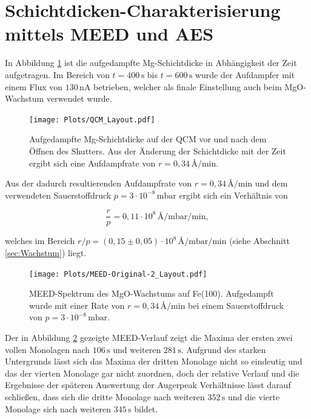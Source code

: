 \section{Schichtdicken-Charakterisierung mittels MEED und AES}

In Abbildung \ref{fig:QCM1} ist die aufgedampfte Mg-Schichtdicke in Abhängigkeit der Zeit aufgetragen.
Im Bereich von $t=400\,\si{\second}$ bis $t=600\,\si{\second}$ wurde der Aufdampfer mit einem Flux von $130\,\si{\nano\ampere}$ betrieben, 
welcher als finale Einstellung auch beim MgO-Wachstum verwendet wurde.

\begin{figure}
  \centering
  \texttt{[image: Plots/QCM\_Layout.pdf]}
  \caption{Aufgedampfte Mg-Schichtdicke auf der QCM vor und nach dem Öffnen des Shutters.
          Aus der Änderung der Schichtdicke mit der Zeit ergibt sich eine Aufdampfrate von $r=0,34\,\si{\angstrom\per\minute}$.}
  \label{fig:QCM1}
\end{figure}

Aus der dadurch resultierenden Aufdampfrate von $r=0,34\,\si{\angstrom\per\minute}$ und dem verwendeten 
Sauerstoffdruck $p=3\cdot 10^{-8}\,\si{\milli\bar}$ ergibt sich ein Verhältnis von

\begin{equation*}
  \frac{r}{p}=0,11\cdot 10^8 \,\si{\angstrom\per\milli\bar\per\minute},
\end{equation*}

welches im Bereich $r/p=(0,15\pm 0,05)\cdot 10^8 \,\si{\angstrom\per\milli\bar\per\minute}$ (siehe Abschnitt \ref{sec:Wachstum}) liegt.

\begin{figure}[H]
  \centering
  \texttt{[image: Plots/MEED-Original-2\_Layout.pdf]}
  \caption{MEED-Spektrum des MgO-Wachstums auf Fe(100). Aufgedampft wurde mit einer Rate von $r=0,34\,\si{\angstrom\per\minute}$ 
          bei einem Sauerstoffdruck von $p=3\cdot 10^{-8}\,\si{\milli\bar}$.}
  \label{fig:MEED1}
\end{figure}

Der in Abbildung \ref{fig:MEED1} gezeigte MEED-Verlauf zeigt die Maxima der ersten zwei vollen Monolagen nach $106\,\si{\second}$ und weiteren $281\,\si{\second}$.
Aufgrund des starken Untergrunds lässt sich das Maxima der dritten Monolage nicht so eindeutig und  das der vierten Monolage gar nicht zuordnen, 
doch der relative Verlauf und die Ergebnisse der späteren Auswertung der Augerpeak Verhältnisse lässt darauf schließen, dass sich
die dritte Monolage nach weiteren $352\,\si{\second}$ und die vierte Monolage sich nach weiteren $345\,\si{\second}$ bildet. 

